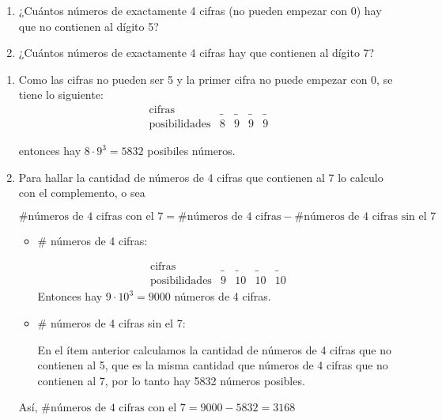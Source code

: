 \begin{enunciado}{\ejercicio}
  \begin{enumerate}[label=\alph*)]
    \item ¿Cuántos números de exactamente 4 cifras (no pueden empezar con 0)
          hay que no contienen al dígito 5?
    \item ¿Cuántos números de exactamente 4 cifras hay que contienen al dígito 7?
  \end{enumerate}
\end{enunciado}

\begin{enumerate}[label=\alph*)]
  \item
        Como las cifras no pueden ser 5 y la primer cifra no puede empezar con 0, se tiene lo siguiente:
        $$
          \begin{array}{r|cccc}
            \text{cifras}        & \_ & \_ & \_ & \_ \\
            \text{posibilidades} & 8  & 9  & 9  & 9
          \end{array}
        $$

        entonces hay $8 \cdot 9^3 = 5832$ posibiles números.

  \item Para hallar la cantidad de números de 4 cifras que contienen al 7 lo calculo con
        el complemento, o sea

        $\# \text{números de 4 cifras con el 7} = \# \text{números de 4 cifras} - \# \text{números de 4 cifras sin el 7}$\\

        \begin{itemize}
          \item \# números de 4 cifras:

                $$
                  \begin{array}{r|cccc}
                    \text{cifras}        & \_ & \_ & \_ & \_ \\
                    \text{posibilidades} & 9  & 10 & 10 & 10
                  \end{array}
                $$
                Entonces hay $9 \cdot 10^3 = 9000$ números de 4 cifras.

          \item \# números de 4 cifras sin el 7:

                En el ítem anterior calculamos la cantidad de números de 4 cifras que no contienen al 5, que es la misma cantidad que números de 4 cifras que no contienen al 7, por lo tanto hay 5832 números posibles.
        \end{itemize}

        Así, $\# \text{números de 4 cifras con el 7} = 9000 - 5832 = 3168$
\end{enumerate}

